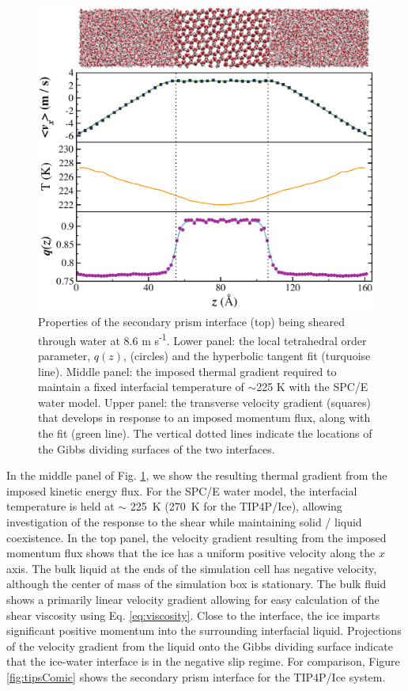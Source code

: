 \begin{figure}
\includegraphics[width=\linewidth]{Figures/SecPrismComicStrip}
\caption{\label{fig:spComic} Properties of the secondary prism
  interface (top) being sheared through water at 8.6 m
  s\textsuperscript{-1}. Lower panel: the local tetrahedral order
  parameter, $q(z)$, (circles) and the hyperbolic tangent fit
  (turquoise line).  Middle panel: the imposed thermal gradient
  required to maintain a fixed interfacial temperature of $\sim$225 K
  with the SPC/E water model. Upper panel: the transverse velocity
  gradient (squares) that develops in response to an imposed momentum
  flux, along with the fit (green line). The vertical dotted lines
  indicate the locations of the Gibbs dividing surfaces of the two
  interfaces.}
\end{figure}

In the middle panel of Fig. \ref{fig:spComic}, we show the resulting
thermal gradient from the imposed kinetic energy flux. For the SPC/E
water model, the interfacial temperature is held at $\sim$ 225~K
(270~K for the TIP4P/Ice), allowing investigation of the response to
the shear while maintaining solid / liquid coexistence. In the top
panel, the velocity gradient resulting from the imposed momentum flux
shows that the ice has a uniform positive velocity along the $x$
axis. The bulk liquid at the ends of the simulation cell has negative
velocity, although the center of mass of the simulation box is
stationary.  The bulk fluid shows a primarily linear velocity gradient
allowing for easy calculation of the shear viscosity using
Eq. \eqref{eq:viscosity}. Close to the interface, the ice imparts
significant positive momentum into the surrounding interfacial liquid.
Projections of the velocity gradient from the liquid onto the Gibbs
dividing surface indicate that the ice-water interface is in the
negative slip regime. For comparison, Figure \ref{fig:tipsComic} shows
the secondary prism interface for the TIP4P/Ice system.

